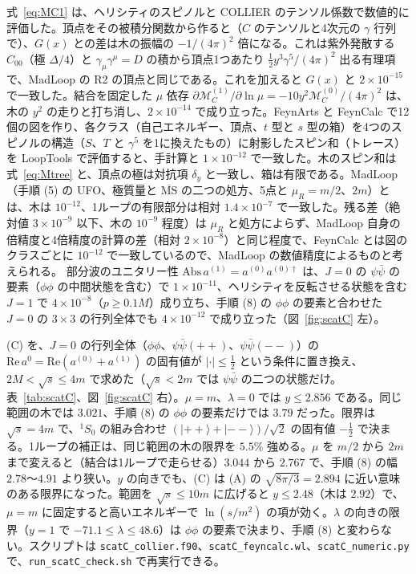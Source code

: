 \documentclass[a4paper,10pt]{ltjsarticle}
\newcommand{\MSbar}{\overline{\mathrm{MS}}}
\begin{document}
式~\eqref{eq:MC1} は、ヘリシティのスピノルと COLLIER のテンソル係数で数値的に評価した。頂点をその被積分関数から作ると（$C$ のテンソルと4次元の $\gamma$ 行列で）、$G(x)$ との差は木の振幅の $-1/(4\pi)^2$ 倍になる。これは紫外発散する $C_{00}$（極 $\Delta/4$）と $\gamma_\mu\gamma^\mu=D$ の積から頂点1つあたり $\frac12y^3\gamma^5/(4\pi)^2$ 出る有理項で、MadLoop の R2 の頂点と同じである。これを加えると $G(x)$ と $2\times10^{-15}$ で一致した。結合を固定した $\mu$ 依存 $\partial\mathcal M_C^{(1)}/\partial\ln\mu=-10y^2\mathcal M_C^{(0)}/(4\pi)^2$ は、木の $y^2$ の走りと打ち消し、$2\times10^{-14}$ で成り立った。FeynArts と FeynCalc で12個の図を作り、各クラス（自己エネルギー、頂点、$t$ 型と $s$ 型の箱）を4つのスピノルの構造（$S$、$T$ と $\gamma^5$ を1に換えたもの）に射影したスピン和（トレース）を LoopTools で評価すると、手計算と $1\times10^{-12}$ で一致した。木のスピン和は式~\eqref{eq:Mtree} と、頂点の極は対抗項 $\delta_y$ と一致し、箱は有限である。MadLoop（手順 (5) の UFO、極質量と $\MSbar$ の二つの処方、5点と $\mu_R=m/2$、$2m$）とは、木は $10^{-12}$、1ループの有限部分は相対 $1.4\times10^{-7}$ で一致した。残る差（絶対値 $3\times10^{-9}$ 以下、木の $10^{-9}$ 程度）は $\mu_R$ と処方によらず、MadLoop 自身の倍精度と4倍精度の計算の差（相対 $2\times10^{-8}$）と同じ程度で、FeynCalc とは図のクラスごとに $10^{-12}$ で一致しているので、MadLoop の数値精度によるものと考えられる。 部分波のユニタリー性 $\mathrm{Abs}\,a^{(1)}=a^{(0)}a^{(0)\dagger}$ は、$J=0$ の $\psi\bar\psi$ の要素（$\phi\phi$ の中間状態を含む）で $1\times10^{-11}$、ヘリシティを反転させる状態を含む $J=1$ で $4\times10^{-8}$（$p\ge0.1M$）成り立ち、手順 (8) の $\phi\phi$ の要素と合わせた $J=0$ の $3\times3$ の行列全体でも $4\times10^{-12}$ で成り立った（図~\ref{fig:scatC} 左）。

(C) を、$J=0$ の行列全体（$\phi\phi$、$\psi\bar\psi(++)$、$\psi\bar\psi(--)$）の $\mathrm{Re}\,a^0=\mathrm{Re}(a^{(0)}+a^{(1)})$ の固有値が $|\cdot|\le\frac12$ という条件に置き換え、$2M<\sqrt s\le4m$ で求めた（$\sqrt s<2m$ では $\psi\bar\psi$ の二つの状態だけ。表~\ref{tab:scatC}、図~\ref{fig:scatC} 右）。$\mu=m$、$\lambda=0$ では $y\le2.856$ である。同じ範囲の木では $3.021$、手順 (8) の $\phi\phi$ の要素だけでは $3.79$ だった。限界は $\sqrt s=4m$ で、${}^1S_0$ の組み合わせ $(|{++}\rangle+|{--}\rangle)/\sqrt2$ の固有値 $-\frac12$ で決まる。1ループの補正は、同じ範囲の木の限界を $5.5\%$ 強める。$\mu$ を $m/2$ から $2m$ まで変えると（結合は1ループで走らせる）$3.044$ から $2.767$ で、手順 (8) の幅 $2.78$〜$4.91$ より狭い。$y$ の向きでも、(C) は (A) の $\sqrt{8\pi/3}=2.894$ に近い意味のある限界になった。範囲を $\sqrt s\le10m$ に広げると $y\le2.48$（木は $2.92$）で、$\mu=m$ に固定すると高いエネルギーで $\ln(s/m^2)$ の項が効く。$\lambda$ の向きの限界（$y=1$ で $-71.1\le\lambda\le48.6$）は $\phi\phi$ の要素で決まり、手順 (8) と変わらない。スクリプトは \texttt{scatC\_collier.f90}、\texttt{scatC\_feyncalc.wl}、\texttt{scatC\_numeric.py} で、\texttt{run\_scatC\_check.sh} で再実行できる。
\end{document}
